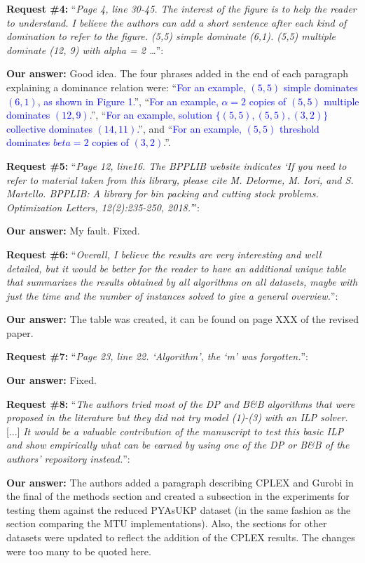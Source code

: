 \documentclass{elsarticle}
\begin{document}
\textbf{Request \#4:} ``\textit{Page 4, line 30-45. The interest of the figure is to help the reader to understand. I believe the authors can add a short sentence after each kind of domination to refer to the figure. (5,5) simple dominate (6,1). (5,5) multiple dominate (12, 9) with alpha = 2 \dots}'': 

\textbf{Our answer:} Good idea. The four phrases added in the end of each paragraph explaining a dominance relation were: ``\textcolor{blue}{For an example, \((5, 5)\) simple dominates \((6, 1)\), as shown in Figure 1.}'', ``\textcolor{blue}{For an example, \(\alpha = 2\) copies of \((5, 5)\) multiple dominates \((12, 9)\).}'', ``\textcolor{blue}{For an example, solution \(\{(5, 5), (5, 5), (3, 2)\}\) collective dominates \((14, 11)\).}'', and ``\textcolor{blue}{For an example, \((5, 5)\) threshold dominates \(beta = 2\) copies of \((3, 2)\)}.''.
\medskip

\textbf{Request \#5:} ``\textit{Page 12, line16. The BPPLIB website indicates `If you need to refer to material taken from this library, please cite M. Delorme, M. Iori, and S. Martello. BPPLIB: A library for bin packing and cutting stock problems. Optimization Letters, 12(2):235-250, 2018.'}'': 

\textbf{Our answer:} My fault. Fixed.
\medskip

\textbf{Request \#6:} ``\textit{Overall, I believe the results are very interesting and well detailed, but it would be better for the reader to have an additional unique table that summarizes the results obtained by all algorithms on all datasets, maybe with just the time and the number of instances solved to give a general overview.}'': 

\textbf{Our answer:} The table was created, it can be found on page XXX of the revised paper. 
\medskip

\textbf{Request \#7:} ``\textit{Page 23, line 22. `Algorithm', the `m' was forgotten.}'': 

\textbf{Our answer:} Fixed.
\medskip

\textbf{Request \#8:} ``\textit{The authors tried most of the DP and B\&B algorithms that were proposed in the literature but they did not try model (1)-(3) with an ILP solver.} [...] \textit{It would be a valuable contribution of the manuscript to test this basic ILP and show empirically what can be earned by using one of the DP or B\&B of the authors' repository instead.}'': 

\textbf{Our answer:} The authors added a paragraph describing CPLEX and Gurobi in the final of the methods section and created a subsection in the experiments for testing them against the reduced PYAsUKP dataset (in the same fashion as the section comparing the MTU implementations). Also, the sections for other datasets were updated to reflect the addition of the CPLEX results. The changes were too many to be quoted here.
\medskip
\end{document}
